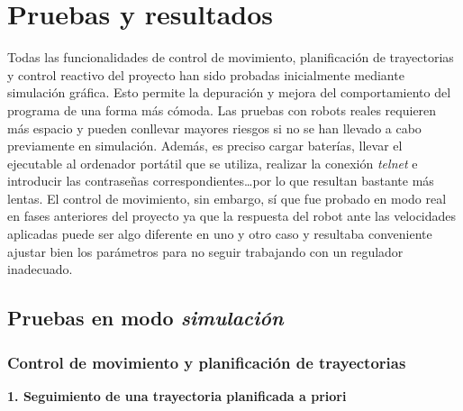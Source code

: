 %
%
%


\section{Pruebas y resultados}
Todas las funcionalidades de control de movimiento, planificación de trayectorias y control reactivo del proyecto han sido probadas inicialmente mediante simulación gráfica. Esto permite la depuración y mejora del comportamiento del programa de una forma más cómoda. Las pruebas con robots reales requieren más espacio y pueden conllevar mayores riesgos si no se han llevado a cabo previamente en simulación. Además, es preciso cargar baterías, llevar el ejecutable al ordenador portátil que se utiliza, realizar la conexión \emph{telnet} e introducir las contraseñas correspondientes\ldots por lo que resultan bastante más lentas. El control de movimiento, sin embargo, sí que fue probado en modo real en fases anteriores del proyecto ya que la respuesta del robot ante las velocidades aplicadas puede ser algo diferente en uno y otro caso y resultaba conveniente ajustar bien los parámetros para no seguir trabajando con un regulador inadecuado.

\subsection{Pruebas en modo \emph{simulación}}

\subsubsection{Control de movimiento y planificación de trayectorias}

\noindent
\textbf{\textbf{1.} Seguimiento de una trayectoria planificada a priori}

